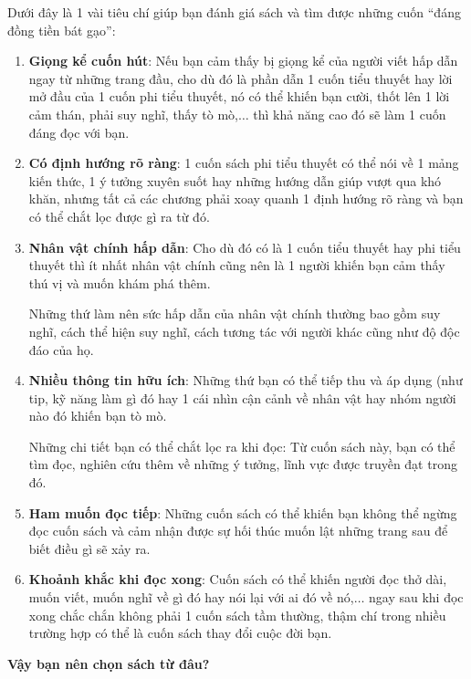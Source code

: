 \documentclass{book}
\numberwithin{equation}{section}
\begin{document}
%
Dưới đây là 1 vài tiêu chí giúp bạn đánh giá sách và tìm được những cuốn ``đáng đồng tiền bát gạo'':
\begin{enumerate}
    \item \textbf{Giọng kể cuốn hút}: Nếu bạn cảm thấy bị giọng kể của người viết hấp dẫn ngay từ những trang đầu, cho dù đó là phần dẫn 1 cuốn tiểu thuyết hay lời mở đầu của 1 cuốn phi tiểu thuyết, nó có thể khiến bạn cười, thốt lên 1 lời cảm thán, phải suy nghĩ, thấy tò mò,$\ldots$ thì khả năng cao đó sẽ làm 1 cuốn đáng đọc với bạn.
    \item \textbf{Có định hướng rõ ràng}: 1 cuốn sách phi tiểu thuyết có thể nói về 1 mảng kiến thức, 1 ý tưởng xuyên suốt hay những hướng dẫn giúp vượt qua khó khăn, nhưng tất cả các chương phải xoay quanh 1 định hướng rõ ràng và bạn có thể chắt lọc được gì ra từ đó.
    \item \textbf{Nhân vật chính hấp dẫn}: Cho dù đó có là 1 cuốn tiểu thuyết hay phi tiểu thuyết thì ít nhất nhân vật chính cũng nên là 1 người khiến bạn cảm thấy thú vị và muốn khám phá thêm.
    
    Những thứ làm nên sức hấp dẫn của nhân vật chính thường bao gồm suy nghĩ, cách thể hiện suy nghĩ, cách tương tác với người khác cũng như độ độc đáo của họ.
    \item \textbf{Nhiều thông tin hữu ích}: Những thứ bạn có thể tiếp thu và áp dụng (như tip, kỹ năng làm gì đó hay 1 cái nhìn cận cảnh về nhân vật hay nhóm người nào đó khiến bạn tò mò.
    
    Những chi tiết bạn có thể chắt lọc ra khi đọc: Từ cuốn sách này, bạn có thể tìm đọc, nghiên cứu thêm về những ý tưởng, lĩnh vực được truyền đạt trong đó.
    \item \textbf{Ham muốn đọc tiếp}: Những cuốn sách có thể khiến bạn không thể ngừng đọc cuốn sách và cảm nhận được sự hối thúc muốn lật những trang sau để biết điều gì sẽ xảy ra.
    \item \textbf{Khoảnh khắc khi đọc xong}: Cuốn sách có thể khiến người đọc thở dài, muốn viết, muốn nghĩ về gì đó hay nói lại với ai đó về nó,$\ldots$ ngay sau khi đọc xong chắc chắn không phải 1 cuốn sách tầm thường, thậm chí trong nhiều trường hợp có thể là cuốn sách thay đổi cuộc đời bạn.
\end{enumerate}
\textbf{Vậy bạn nên chọn sách từ đâu?}
\end{document}
